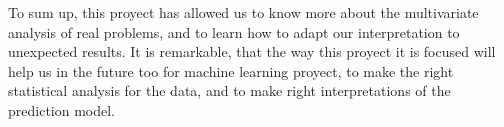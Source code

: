 \documentclass[10pt,a4paper]{article}
\theoremstyle{definition}
\theoremstyle{definition}
\begin{document}
To sum up, this proyect has allowed us to know more about the multivariate analysis of real problems, and to learn how to adapt our interpretation to unexpected results. It is remarkable, that the way this proyect it is focused will help us in the future too for machine learning proyect, to make the right statistical analysis for the data, and to make right interpretations of the prediction model. \\


 
\end{document}
